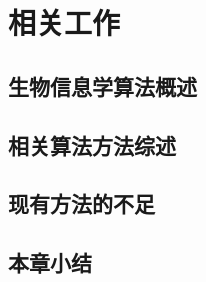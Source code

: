 \chapter{相关工作}
\label{ch:literature}


\section{生物信息学算法概述}
\label{sec:bioinformatics-overview}

\section{相关算法方法综述}
\label{sec:algorithm-review}

\section{现有方法的不足}
\label{sec:limitations}

\section{本章小结}
\label{sec:ch2-summary}
